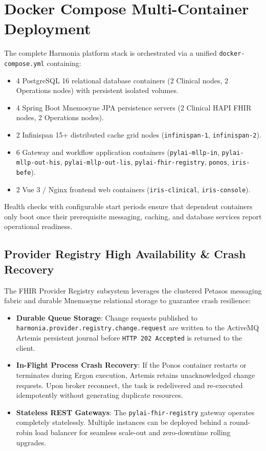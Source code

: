 \section{Docker Compose Multi-Container Deployment}

The complete Harmonia platform stack is orchestrated via a unified \texttt{docker-compose.yml} containing:
\begin{itemize}
    \item 4 PostgreSQL 16 relational database containers (2 Clinical nodes, 2 Operations nodes) with persistent isolated volumes.
    \item 4 Spring Boot Mnemosyne JPA persistence servers (2 Clinical HAPI FHIR nodes, 2 Operations nodes).
    \item 2 Infinispan 15+ distributed cache grid nodes (\texttt{infinispan-1}, \texttt{infinispan-2}).
    \item 6 Gateway and workflow application containers (\texttt{pylai-mllp-in}, \texttt{pylai-mllp-out-his}, \texttt{pylai-mllp-out-lis}, \texttt{pylai-fhir-registry}, \texttt{ponos}, \texttt{iris-befe}).
    \item 2 Vue 3 / Nginx frontend web containers (\texttt{iris-clinical}, \texttt{iris-console}).
\end{itemize}

Health checks with configurable start periods ensure that dependent containers only boot once their prerequisite messaging, caching, and database services report operational readiness.

\subsection{Provider Registry High Availability \& Crash Recovery}
The FHIR Provider Registry subsystem leverages the clustered Petasos messaging fabric and durable Mnemosyne relational storage to guarantee crash resilience:
\begin{itemize}
    \item \textbf{Durable Queue Storage}: Change requests published to \texttt{harmonia.provider.registry.change.request} are written to the ActiveMQ Artemis persistent journal before \texttt{HTTP 202 Accepted} is returned to the client.
    \item \textbf{In-Flight Process Crash Recovery}: If the Ponos container restarts or terminates during Ergon execution, Artemis retains unacknowledged change requests. Upon broker reconnect, the task is redelivered and re-executed idempotently without generating duplicate resources.
    \item \textbf{Stateless REST Gateways}: The \texttt{pylai-fhir-registry} gateway operates completely statelessly. Multiple instances can be deployed behind a round-robin load balancer for seamless scale-out and zero-downtime rolling upgrades.
\end{itemize}

